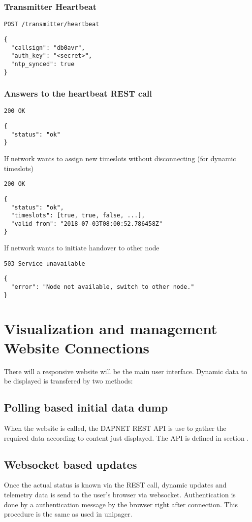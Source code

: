 \documentclass[a4paper]{article}
\begin{document}
\subsubsection{Transmitter Heartbeat}
\texttt{POST /transmitter/heartbeat}
\begin{lstlisting}
{
  "callsign": "db0avr",
  "auth_key": "<secret>",
  "ntp_synced": true
}
\end{lstlisting}

\subsubsection{Answers to the heartbeat REST call}
\texttt{200 OK}
\begin{lstlisting}
{
  "status": "ok"
}
\end{lstlisting}

If network wants to assign new timeslots without disconnecting (for dynamic timeslots)

\texttt{200 OK}
\begin{lstlisting}
{
  "status": "ok",
  "timeslots": [true, true, false, ...],
  "valid_from": "2018-07-03T08:00:52.786458Z"
}
\end{lstlisting}

If network wants to initiate handover to other node

\texttt{503 Service unavailable}
\begin{lstlisting}
{
  "error": "Node not available, switch to other node."
}
\end{lstlisting}

\section{Visualization and management Website Connections}
There will a responsive website will be the main user interface. Dynamic data to be displayed is transfered by two methods:

\subsection{Polling based initial data dump}
When the website is called, the DAPNET REST API is use to gather the required data according to content just displayed. The API is defined in section .

\subsection{Websocket based updates}
Once the actual status is known via the REST call, dynamic updates and telemetry data is send to the user's browser via websocket. Authentication is done by a authentication message by the browser right after connection. This procedure is the same as used in unipager. 
\end{document}
